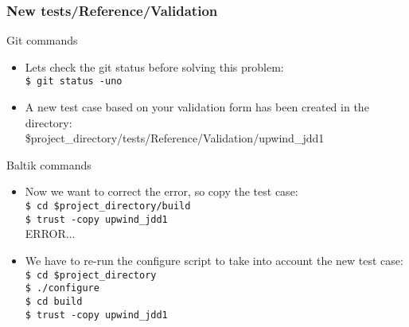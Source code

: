 \documentclass[10pt, hyperref={unicode=true,pdfusetitle, bookmarks=true,bookmarksnumbered=false,bookmarksopen=false, breaklinks=false,pdfborder={0 0 1},backref=true,colorlinks=true,linkcolor=darkblue,pageanchor, urlcolor=darkblue}]{beamer}
\begin{document}
\begin{frame}
\frametitle{New tests/Reference/Validation}

\begin{alertblock}{Git commands}
\begin{itemize}
\item Lets check the git status before solving this problem:\\
\texttt{\$ git status -uno}\\
\item A new test case based on your validation form has been created in the directory:\\
\$project\_directory/tests/Reference/Validation/upwind\_jdd1
\end{itemize}
\end{alertblock}

\begin{block}{Baltik commands}
\begin{itemize}
\item Now we want to correct the error, so copy the test case:\\
\texttt{\$ cd \$project\_directory/build}\\
\texttt{\$ trust -copy upwind\_jdd1}\\
ERROR...
\item We have to re-run the configure script to take into account the new test case:\\
\texttt{\$ cd \$project\_directory}\\
\texttt{\$ ./configure}\\
\texttt{\$ cd build}\\
\texttt{\$ trust -copy upwind\_jdd1}

\end{itemize}
\end{block}

\end{frame}
\end{document}
